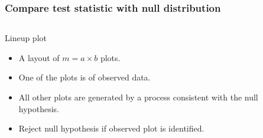 \documentclass{beamer}
\begin{document}
\begin{frame}
  \frametitle{Compare test statistic with null distribution}
	\begin{columns}
		\begin{column}{0.4\textwidth} Lineup plot
		  \begin{itemize}
			  \item A layout of $m=a \times b$ plots.
			  \item One of the plots is of observed data.
			  \item All other plots are generated by a process consistent with the null hypothesis.
			  \item Reject null hypothesis if observed plot is identified.
		  \end{itemize}		
			
		\end{column}
		
		\begin{column}{0.6\textwidth}
			 \begin{center}  \end{center}
		\end{column}
	\end{columns}  
\end{frame}
\end{document}
